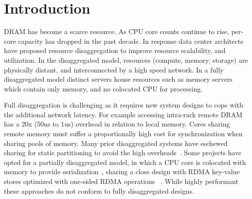 \section{Introduction}
\label{sec:intro}


DRAM has become a scarce resource. As CPU core counts
continue to rise, per-core capacity has dropped in the past
decade. In response data center architects have proposed
resource disaggregation to improve resource scalability, and
utilization. In the disaggregated model, resources (compute,
memory, storage) are physically distant, and interconnected
by a high speed network. In a fully disaggregated model
distinct servers house resources such as memory servers
which contain only memory, and no colocated CPU for
processing.


Full disaggregation is challenging as it requires new system
designs to cope with the additional network latency.  For
example accessing intra-rack remote DRAM has a 20x (50ns to
1us) overhead in relation to local memory. Cores sharing
remote memory must suffer a proportionally high cost for
synchronization when sharing pools of memory. Many prior
disaggregated systems have eschewed sharing for static
partitioning to avoid the high overheads~\cite{legoos,
blade-server, remote-reigions}.  Some projects have opted
for a partially disaggregated model, in which a CPU core is
colocated with memory to provide
serialization~\cite{clover}, sharing a close design with
RDMA key-value stores optimized with one-sided RDMA
operations ~\cite{herd,erpc,pilaf,cell,clover}. While highly
performant these approaches do not conform to fully
disaggregated designs.



